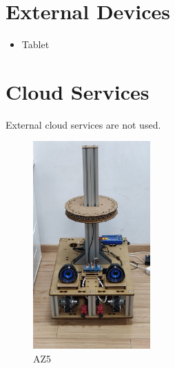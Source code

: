 % 
\section*{External Devices}
\begin{itemize}[nosep]
	\item Tablet
\end{itemize}


%
\section*{Cloud Services}
External cloud services are not used.


\setlength\intextsep{0pt}
\begin{figure}
	\centering
	\includegraphics[width=0.4\textwidth]{images/AZ5.jpeg}
	\caption{AZ5}
	\label{fig:wall-e}
\end{figure}
